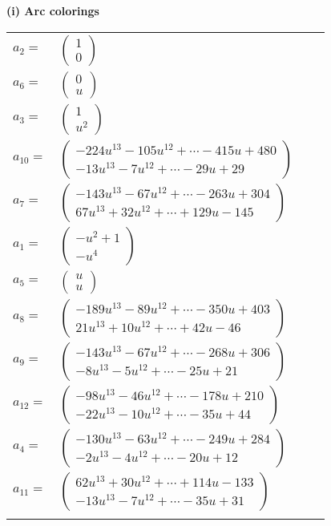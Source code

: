 \documentclass[1p]{elsarticle_modified}
\theoremstyle{definition}
\begin{document}
\flushleft \textbf{(i) Arc colorings}\\
\begin{tabular}{m{7pt} m{180pt} m{7pt} m{180pt} }
\flushright $a_{2}=$&$\begin{pmatrix}1\\0\end{pmatrix}$ \\
\flushright $a_{6}=$&$\begin{pmatrix}0\\u\end{pmatrix}$ \\
\flushright $a_{3}=$&$\begin{pmatrix}1\\u^2\end{pmatrix}$ \\
\flushright $a_{10}=$&$\begin{pmatrix}-224 u^{13}-105 u^{12}+\cdots-415 u+480\\-13 u^{13}-7 u^{12}+\cdots-29 u+29\end{pmatrix}$ \\
\flushright $a_{7}=$&$\begin{pmatrix}-143 u^{13}-67 u^{12}+\cdots-263 u+304\\67 u^{13}+32 u^{12}+\cdots+129 u-145\end{pmatrix}$ \\
\flushright $a_{1}=$&$\begin{pmatrix}- u^2+1\\- u^4\end{pmatrix}$ \\
\flushright $a_{5}=$&$\begin{pmatrix}u\\u\end{pmatrix}$ \\
\flushright $a_{8}=$&$\begin{pmatrix}-189 u^{13}-89 u^{12}+\cdots-350 u+403\\21 u^{13}+10 u^{12}+\cdots+42 u-46\end{pmatrix}$ \\
\flushright $a_{9}=$&$\begin{pmatrix}-143 u^{13}-67 u^{12}+\cdots-268 u+306\\-8 u^{13}-5 u^{12}+\cdots-25 u+21\end{pmatrix}$ \\
\flushright $a_{12}=$&$\begin{pmatrix}-98 u^{13}-46 u^{12}+\cdots-178 u+210\\-22 u^{13}-10 u^{12}+\cdots-35 u+44\end{pmatrix}$ \\
\flushright $a_{4}=$&$\begin{pmatrix}-130 u^{13}-63 u^{12}+\cdots-249 u+284\\-2 u^{13}-4 u^{12}+\cdots-20 u+12\end{pmatrix}$ \\
\flushright $a_{11}=$&$\begin{pmatrix}62 u^{13}+30 u^{12}+\cdots+114 u-133\\-13 u^{13}-7 u^{12}+\cdots-35 u+31\end{pmatrix}$\\&\end{tabular}
\end{document}
